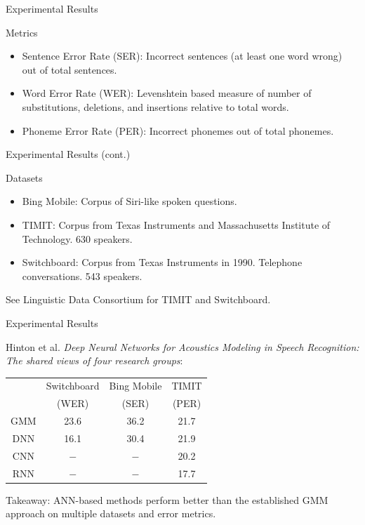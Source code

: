 \documentclass[notes]{beamer}
\begin{document}
\begin{frame}{Experimental Results}
	\vfill
	
	Metrics
	\begin{itemize}
		\item Sentence Error Rate (SER): Incorrect sentences (at least one word wrong) out of total sentences.
		\item Word Error Rate (WER): Levenshtein based measure of number of substitutions, deletions, and insertions relative to total words.
		\item Phoneme Error Rate (PER): Incorrect phonemes out of total phonemes.
	\end{itemize}
	
	\vfill
\end{frame}

\begin{frame}{Experimental Results (cont.)}
	\vfill
	
	Datasets
	\begin{itemize}
		\item Bing Mobile: Corpus of Siri-like spoken questions.
		\item TIMIT: Corpus from Texas Instruments and Massachusetts Institute of Technology. 630 speakers.
		\item Switchboard: Corpus from Texas Instruments in 1990. Telephone conversations. 543 speakers.
	\end{itemize}
	
	\vfill
	
	\begin{center}
		See Linguistic Data Consortium for TIMIT and Switchboard.
	\end{center}
	
	\vfill
\end{frame}

\begin{frame}{Experimental Results}
	\begin{center}
		Hinton et al. \textit{Deep Neural Networks for Acoustics Modeling in Speech Recognition: The shared views of four research groups}:
	\end{center}

	\vfill

	\begin{table}[H]
		\centering
		\begin{tabular}{c|c|c|c}
			& Switchboard & Bing Mobile & TIMIT \\
			& (WER) & (SER) & (PER) \\
			\hline
			GMM & 23.6 & 36.2 & 21.7 \\
			DNN & 16.1 & 30.4 & 21.9 \\
			CNN & $-$ & $-$ & 20.2 \\
			\hline
			RNN & $-$ & $-$ & 17.7
		\end{tabular}
	\end{table}

	\vfill

	\begin{center}
		Takeaway: ANN-based methods perform better than the established GMM approach on multiple datasets and error metrics.
	\end{center}
\end{frame}
\end{document}
